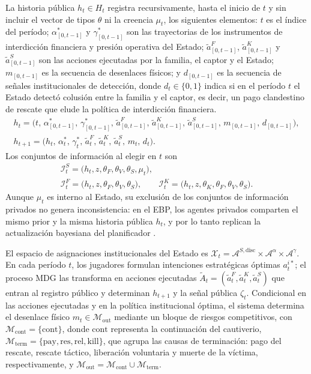 \documentclass[review,authoryear,12pt]{elsarticle}
\theoremstyle{plain}
\theoremstyle{definition}
\newcommand{\1}{\mathbf{1}}
\begin{document}
La historia pública $h_t\in H_t$ registra recursivamente, hasta el inicio de $t$ y sin incluir el vector de tipos $\theta$ ni la creencia $\mu_t$, los siguientes elementos: $t$ es el índice del período; $\alpha^\ast_{[0,t-1]}$ y $\gamma^\ast_{[0,t-1]}$ son las trayectorias de los instrumentos de interdicción financiera y presión operativa del Estado; $\tilde{a}^F_{[0,t-1]}$, $\tilde{a}^K_{[0,t-1]}$ y $\tilde{a}^S_{[0,t-1]}$ son las acciones ejecutadas por la familia, el captor y el Estado; $m_{[0,t-1]}$ es la secuencia de desenlaces físicos; y $d_{[0,t-1]}$ es la secuencia de señales institucionales de detección, donde $d_t\in\{0,1\}$ indica si en el período $t$ el Estado detectó colusión entre la familia y el captor, es decir, un pago clandestino de rescate que elude la política de interdicción financiera.
\begin{gather}
h_t = \bigl(t,\,\alpha^\ast_{[0,t-1]},\,\gamma^\ast_{[0,t-1]},\,\tilde{a}^F_{[0,t-1]},\,\tilde{a}^K_{[0,t-1]},\,\tilde{a}^S_{[0,t-1]},\,m_{[0,t-1]},\,d_{[0,t-1]}\bigr),\label{eq:historia-publica}\\
h_{t+1} = \bigl(h_t,\,\alpha_t^\ast,\,\gamma_t^\ast,\,\tilde{a}_t^F,\,\tilde{a}_t^K,\,\tilde{a}_t^S,\,m_t,\,d_t\bigr).\label{eq:actualizacion-historia}
\end{gather}
Los conjuntos de información al elegir en $t$ son
\begin{gather*}
\mathcal{I}_t^S=\bigl(h_t,z,\theta_F,\theta_V,\theta_S,\mu_t\bigr),\\
\mathcal{I}_t^F=\bigl(h_t,z,\theta_F,\theta_V,\theta_S\bigr),\qquad
\mathcal{I}_t^K=\bigl(h_t,z,\theta_K,\theta_F,\theta_V,\theta_S\bigr).
\end{gather*}
Aunque $\mu_t$ es interno al Estado, su exclusión de los conjuntos de información privados no genera inconsistencia: en el EBP, los agentes privados comparten el mismo prior y la misma historia pública $h_t$, y por lo tanto replican la actualización bayesiana del planificador \citet{FudenbergTirole1991}.

El espacio de asignaciones institucionales del Estado es $\mathcal{X}_t=\mathcal{A}^{S,\mathrm{disc}}\times\mathcal{A}^{\alpha}\times\mathcal{A}^{\gamma}$. En cada período $t$, los jugadores formulan intenciones estratégicas óptimas $a_t^{i\ast}$; el proceso MDG las transforma en acciones ejecutadas $\tilde{A}_t=(\tilde{a}_t^F,\tilde{a}_t^K,\tilde{a}_t^S)$ que entran al registro público y determinan $h_{t+1}$ y la señal pública $\zeta_t$. Condicional en las acciones ejecutadas y en la política institucional óptima, el sistema determina el desenlace físico $m_t\in\mathcal{M}_{\mathrm{out}}$ mediante un bloque de riesgos competitivos, con $\mathcal{M}_{\mathrm{cont}}=\{\mathrm{cont}\}$, donde $\mathrm{cont}$ representa la continuación del cautiverio, $\mathcal{M}_{\mathrm{term}}=\{\mathrm{pay},\mathrm{res},\mathrm{rel},\mathrm{kill}\}$, que agrupa las causas de terminación: pago del rescate, rescate táctico, liberación voluntaria y muerte de la víctima, respectivamente, y $\mathcal{M}_{\mathrm{out}}=\mathcal{M}_{\mathrm{cont}}\cup\mathcal{M}_{\mathrm{term}}$.
\end{document}
